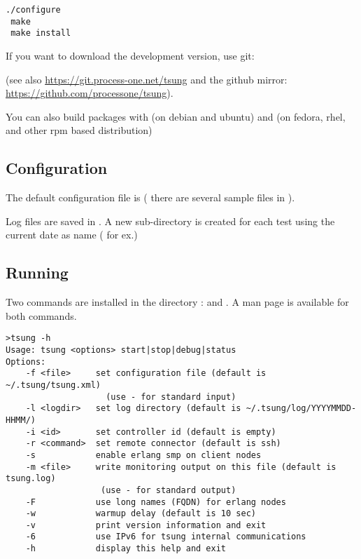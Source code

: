 \documentclass{TSUNG-en}
\begin{document}
\begin{Verbatim}
./configure
 make
 make install
\end{Verbatim}

If you want to download the development version, use git:


 (see also \url{https://git.process-one.net/tsung} and the github
 mirror: \url{https://github.com/processone/tsung}).

You can also build packages with  (on debian and
ubuntu) and  (on fedora, rhel, and other rpm based distribution)

\subsection{Configuration}

The default configuration file is  (
there are several sample files in
).

Log files are saved in  . A new sub-directory
is created for each test using the current date as name
( for ex.)

\subsection{Running}

Two commands are installed in the directory :
 and . A man page is available
for both commands.

\begin{Verbatim}
>tsung -h
Usage: tsung <options> start|stop|debug|status
Options:
    -f <file>     set configuration file (default is ~/.tsung/tsung.xml)
                    (use - for standard input)
    -l <logdir>   set log directory (default is ~/.tsung/log/YYYYMMDD-HHMM/)
    -i <id>       set controller id (default is empty)
    -r <command>  set remote connector (default is ssh)
    -s            enable erlang smp on client nodes
    -m <file>     write monitoring output on this file (default is tsung.log)
                   (use - for standard output)
    -F            use long names (FQDN) for erlang nodes
    -w            warmup delay (default is 10 sec)
    -v            print version information and exit
    -6            use IPv6 for tsung internal communications
    -h            display this help and exit
\end{Verbatim}
\end{document}
